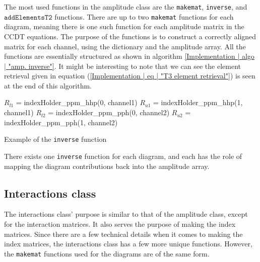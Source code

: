 \documentclass[10pt,twoside]{report}
\begin{document}
	The most used functions in the amplitude class are the \texttt{makemat}, \texttt{inverse}, and $\texttt{addElementsT2}$ functions. There are up to two \texttt{makemat} functions for each diagram, meaning there is one such function for each amplitude matrix in the CCDT equations. The purpose of the  functions is to construct a correctly aligned matrix for each channel, using the dictionary and the amplitude array. All the  functions are essentially structured as shown in algorithm \ref{Implementation | algo | "amp. inverse"}. It might be interesting to note that we can see the element retrieval given in equation (\ref{Implementation | eq | "T3 element retrieval"}) is seen at the end of this algorithm.
	
	\begin{algorithm}[H]
		$R_{l1}$ = indexHolder\_ppm\_hhp(0, channel1)\;
		$R_{u1}$ = indexHolder\_ppm\_hhp(1, channel1)\;
		$R_{l2}$ = indexHolder\_ppm\_pph(0, channel2)\;
		$R_{u2}$ = indexHolder\_ppm\_pph(1, channel2)\;
		\BlankLine
		\BlankLine
		\caption{Example of the \texttt{inverse} function}
		\label{Implementation | algo | "amp. inverse"}
	\end{algorithm}
	\BlankLine
	\BlankLine
	
	There exists one \texttt{inverse} function for each diagram, and each has the role of mapping the diagram contributions back into the amplitude array.
	
	
	\subsection{Interactions class}
	The interactions class' purpose is similar to that of the amplitude class, except for the interaction matrices. It also serves the purpose of making the index matrices. Since there are a few technical details when it comes to making the index matrices, the interactions class has a few more unique functions. However, the \texttt{makemat} functions used for the diagrams are of the same form.\\
	
\end{document}
